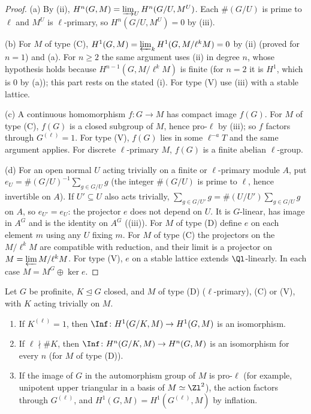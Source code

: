 \begin{proof}
(a) By (ii), $H^n(G,M)=\varinjlim_UH^n(G/U,M^U)$. Each $\#(G/U)$ is prime to $\ell$ and $M^U$ is $\ell$-primary, so
$H^n(G/U,M^U)=0$ by (iii).

(b) For $M$ of type (C), $H^1(G,M)=\varprojlim_kH^1(G,M/\ell^kM)=0$ by (ii) (proved for $n=1$) and (a). For $n\ge2$ the same argument
uses (ii) in degree $n$, whose hypothesis holds because $H^{n-1}(G,M/\ell^kM)$ is finite (for $n=2$ it is $H^1$, which is $0$ by (a)); this part rests on the stated
(i). For type (V) use (iii) with a stable lattice.

(c) A continuous homomorphism $f\colon G\to M$ has compact image $f(G)$. For $M$ of type (C), $f(G)$ is a closed subgroup of $M$, hence pro-$\ell$ by
(iii); so $f$ factors through $G^{(\ell)}=1$. For type (V), $f(G)$ lies in some $\ell^{-a}T$ and the same argument applies. For discrete
$\ell$-primary $M$, $f(G)$ is a finite abelian $\ell$-group.

(d) For an open normal $U$ acting trivially on a finite or $\ell$-primary module $A$, put $e_U=\#(G/U)^{-1}\sum_{g\in G/U}g$ (the integer $\#(G/U)$ is prime to $\ell$,
hence invertible on $A$). If $U'\subseteq U$ also acts trivially, $\sum_{g\in G/U'}g=\#(U/U')\sum_{g\in G/U}g$ on $A$, so $e_{U'}=e_U$: the projector $e$ does not depend on $U$. It is
$G$-linear, has image in $A^G$ and is the identity on $A^G$ ((iii)). For $M$ of type (D) define $e$ on each element $m$ using any $U$
fixing $m$. For $M$ of type (C) the projectors on the $M/\ell^kM$ are compatible with reduction, and their limit is a projector on $M=\varprojlim M/\ell^kM$. For
type (V), $e$ on a stable lattice extends $\Ql$-linearly. In each case $M=M^G\oplus\ker e$.
\end{proof}

\begin{corollary}\label{cor:cohomology:pro-l-quotient}
Let $G$ be profinite, $K\trianglelefteq G$ closed, and $M$ of type (D) ($\ell$-primary), (C) or (V), with $K$ acting trivially on $M$.
\begin{enumerate}[label=(\alph*)]
\item If $K^{(\ell)}=1$, then $\Inf\colon H^1(G/K,M)\to H^1(G,M)$ is an isomorphism.
\item If $\ell\nmid\#K$, then $\Inf\colon H^n(G/K,M)\to H^n(G,M)$ is an isomorphism for every $n$ (for $M$ of type (D)).
\item If the image of $G$ in the automorphism group of $M$ is pro-$\ell$ (for example, unipotent upper triangular in a basis of $M\simeq\Zl^2$), the action
factors through $G^{(\ell)}$, and $H^1(G,M)=H^1(G^{(\ell)},M)$ by inflation.
\end{enumerate}
\end{corollary}

